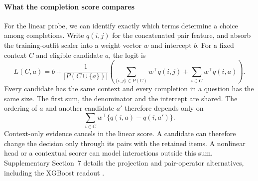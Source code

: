 \paragraph{What the completion score compares}
For the linear probe, we can identify exactly which terms determine a choice among completions. Write $q(i,j)$ for the concatenated pair feature, and absorb the training-outfit scaler into a weight vector $w$ and intercept $b$. For a fixed context $C$ and eligible candidate $a$, the logit is
\begin{equation}
 L(C,a)=b+\frac{1}{|P(C\cup\{a\})|}
 \left(\sum_{\{i,j\}\in P(C)}w^\top q(i,j)
      +\sum_{i\in C}w^\top q(i,a)\right).
\end{equation}
Every candidate has the same context and every completion in a question has the same size. The first sum, the denominator and the intercept are shared. The ordering of $a$ and another candidate $a'$ therefore depends only on
\begin{equation}
 \sum_{i\in C} w^\top\{q(i,a)-q(i,a')\}.
\end{equation}
Context-only evidence cancels in the linear score. A candidate can therefore change the decision only through its pairs with the retained items. A nonlinear head or a contextual scorer can model interactions outside this sum. Supplementary Section~7 details the projection and pair-operator alternatives, including the XGBoost readout \cite{xgboost}.
